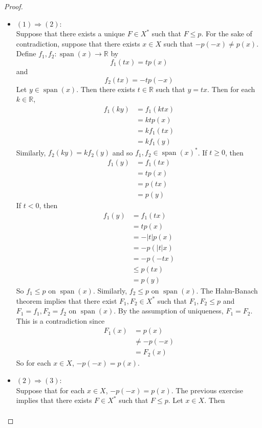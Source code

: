 \documentclass[12pt]{amsart}
\theoremstyle{definition}
\theoremstyle{remark}
\theoremstyle{definition}
\newcommand{\R}{\mathbb{R}}
\DeclareMathOperator{\spn}{span}
\begin{document}
	\begin{proof} \
	\begin{itemize}
	\item $(1) \Rightarrow (2)$: \\ 
	Suppose that there exists a unique $F \in X^*$ such that $F \leq p$. For the sake of contradiction, suppose that there exists $x \in X$ such that $-p(-x) \neq p(x)$. Define $f_1,f_2: \spn(x) \rightarrow \R$ by $$f_1(tx) = t p(x)$$ and $$f_2(tx) = -tp(-x)$$ Let $y \in \spn(x)$. Then there exists $t \in \R$ such that $y = tx$. Then for each $k \in \R$,
	\begin{align*}
	f_1(ky)
	&= f_1(ktx) \\
	&= ktp(x) \\
	&= k f_1(tx) \\
	&= k f_1(y)
	\end{align*}
	Similarly, $f_2(ky) = kf_2(y)$ and so $f_1, f_2 \in \spn(x)^*$. 
	If $t \geq 0$, then 
	\begin{align*}
	f_1(y) 
	&= f_1(tx) \\
	&= tp(x) \\
	&= p(tx) \\
	&= p(y) 
	\end{align*}
	If $t <0$, then 	
	\begin{align*}
	f_1(y) 
	&= f_1(tx) \\
	&= tp(x) \\
	&= -|t|p(x) \\
	&= -p(|t|x) \\
	&= -p(-tx) \\
	& \leq p(tx) \\
	&= p(y)  
	\end{align*}
	So $f_1 \leq p$ on $\spn(x)$. Similarly, $f_2 \leq p$ on $\spn(x)$. The Hahn-Banach theorem implies that there exist $F_1, F_2 \in X^*$ such that $F_1, F_2 \leq p$ and $F_1 = f_1, F_2 = f_2$ on $\spn(x)$. By the assumption of uniqueness, $F_1 = F_2$. This is a contradiction since 
	\begin{align*}
	F_1(x) 
	&= p(x) \\
	& \neq -p(-x) \\
	& = F_2(x) 
	\end{align*}		
So for each $x \in X$, $-p(-x) = p(x)$. 
	\item $(2) \Rightarrow (3)$: \\
	Suppose that for each $x \in X$, $-p(-x) = p(x)$. The previous exercise implies that there exists $F \in X^*$ such that $F \leq p$. Let $x \in X$. Then 
	\begin{align*}

\end{align*}
\end{itemize}
\end{proof}
\end{document}
